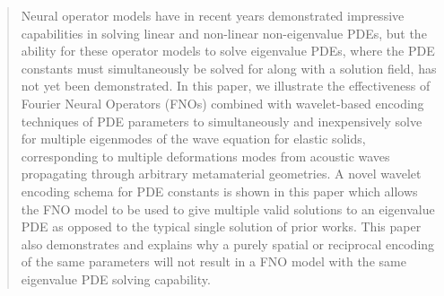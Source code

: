 \documentclass[preprint,review,12pt]{elsarticle}
\begin{document}
\begin{frontmatter}
\author[Mech]{Han Zhang}
\author[Comp]{Cynthia Rudin}
\author[Mech]{Johann Guilleminot}
\author[Mech]{L. Catherine Brinson}
\begin{abstract}
Neural operator models have in recent years demonstrated impressive capabilities in solving linear and non-linear non-eigenvalue PDEs, but the ability for these operator models to solve eigenvalue PDEs, where the PDE constants must simultaneously be solved for along with a solution field, has not yet been demonstrated. In this paper, we illustrate the effectiveness of Fourier Neural Operators (FNOs) combined with wavelet-based encoding techniques of PDE parameters to simultaneously and inexpensively solve for multiple eigenmodes of the wave equation for elastic solids, corresponding to multiple deformations modes from acoustic waves propagating through arbitrary metamaterial geometries. A novel wavelet encoding schema for PDE constants is shown in this paper which allows the FNO model to be used to give multiple valid solutions to an eigenvalue PDE as opposed to the typical single solution of prior works. This paper also demonstrates and explains why a purely spatial or reciprocal encoding of the same parameters will not result in a FNO model with the same eigenvalue PDE solving capability.

\end{abstract}




\end{frontmatter}
\end{document}
